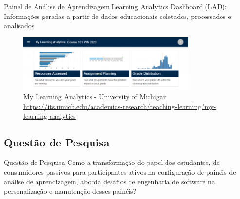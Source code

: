 \begin{frame}{Painel de Análise de Aprendizagem}
    Learning Analytics Dashboard (LAD): Informações geradas a partir de dados educacionais coletados, processados e analisados

    \begin{figure}[H]
        \centering
        \label{fig:digital_learning}
        \includegraphics[width=0.8\textwidth]{../../images/myla.png}
        \\ \small My Learning Analytics - University of Michigan
        \\ \small \url{https://its.umich.edu/academics-research/teaching-learning/my-learning-analytics}
    \end{figure}
\end{frame}

\subsection{Questão de Pesquisa}
\begin{frame}{Questão de Pesquisa}
    Como a transformação do papel dos estudantes, de consumidores passivos para participantes ativos na configuração de painéis de análise de aprendizagem, aborda desafios de engenharia de software na personalização e manutenção desses painéis?
\end{frame}

